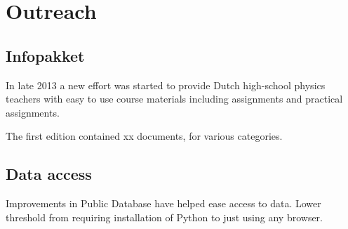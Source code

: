 \chapter{Outreach}
\label{ch:outreach}

\section{Infopakket}

In late 2013 a new effort was started to provide Dutch high-school
physics teachers with easy to use course materials including assignments
and practical assignments.

The first edition contained xx documents, for various categories.


\section{Data access}

Improvements in Public Database have helped ease access to data. Lower
threshold from requiring installation of Python to just using any
browser.

